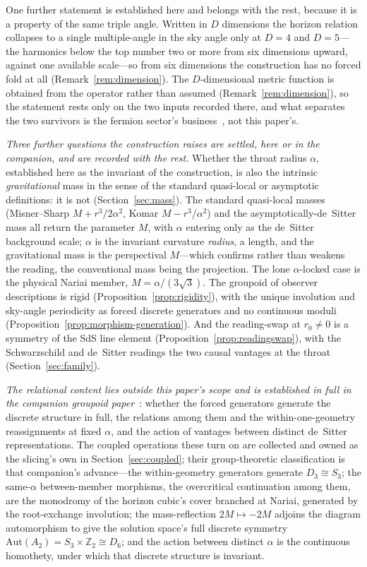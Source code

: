 \documentclass[11pt,a4paper]{article}
\theoremstyle{definition}
\begin{document}
One further statement is established here and belongs with the rest, because it is a property of the same triple angle. Written in $D$ dimensions the horizon relation collapses to a single multiple-angle in the sky angle only at $D=4$ and $D=5$---the harmonics below the top number two or more from six dimensions upward, against one available scale---so from six dimensions the construction has no forced fold at all (Remark~\ref{rem:dimension}). The $D$-dimensional metric function is obtained from the operator rather than assumed (Remark~\ref{rem:dimension}), so the statement rests only on the two inputs recorded there, and what separates the two survivors is the fermion sector's business~\cite{JanzenMatter}, not this paper's.


\emph{Three further questions the construction raises are settled, here or in the companion, and are
recorded with the rest.} Whether the throat radius $\alpha$, established here as the invariant of the
construction, is also the intrinsic \emph{gravitational} mass in the sense of the standard quasi-local or
asymptotic definitions: it is not (Section~\ref{sec:mass}). The standard quasi-local masses
(Misner--Sharp $M+r^{3}/2\alpha^{2}$, Komar $M-r^{3}/\alpha^{2}$) and the asymptotically-de~Sitter mass
all return the parameter $M$, with $\alpha$ entering only as the de~Sitter background scale; $\alpha$ is
the invariant curvature \emph{radius}, a length, and the gravitational mass is the perspectival
$M$---which confirms rather than weakens the reading, the conventional mass being the projection. The lone
$\alpha$-locked case is the physical Nariai member, $M=\alpha/(3\sqrt3)$. The groupoid of observer
descriptions is rigid (Proposition~\ref{prop:rigidity}), with the unique involution and sky-angle
periodicity as forced discrete generators and no continuous moduli
(Proposition~\ref{prop:morphism-generation}). And the reading-swap at $r_{0}\neq0$ is a symmetry of the
SdS line element (Proposition~\ref{prop:readingswap}), with the Schwarzschild and de~Sitter readings the
two causal vantages at the throat (Section~\ref{sec:family}).

\emph{The relational content lies outside this paper's scope and is established in full in the companion
groupoid paper}~\cite{JanzenGroupoid}: whether the forced generators generate the discrete structure in
full, the relations among them and the within-one-geometry reassignments at fixed $\alpha$, and the action
of vantages between distinct de~Sitter representations. The coupled operations these turn on are collected
and owned as the slicing's own in Section~\ref{sec:coupled}; their group-theoretic classification is that
companion's advance---the within-geometry generators generate $D_{3}\cong S_{3}$; the same-$\alpha$
between-member morphisms, the overcritical continuation among them, are the monodromy of the horizon
cubic's cover branched at Nariai, generated by the root-exchange involution; the mass-reflection
$2M\mapsto-2M$ adjoins the diagram automorphism to give the solution space's full discrete symmetry
$\mathrm{Aut}(A_{2})=S_{3}\times\mathbb{Z}_{2}\cong D_{6}$; and the action between distinct $\alpha$ is
the continuous homothety, under which that discrete structure is invariant.
\end{document}
